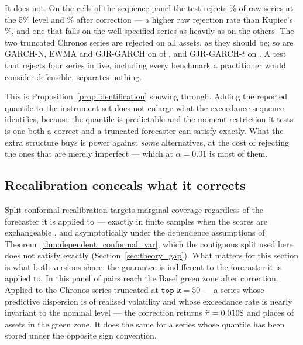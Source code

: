 \documentclass[preprint,11pt,authoryear]{elsarticle}
\newcommand{\1}{\boldsymbol{1}}
\begin{document}
It does not. On the \nSeqDQCells{} cells of the sequence panel the test rejects
\nSeqDQRejRaw\% of raw series at the 5\% level and \nSeqDQRejCor\% after
correction --- a higher raw rejection rate than Kupiec's
\nSeqKupiecRejRawOne\%, and one that falls on the well-specified series as
heavily as on the others. The two truncated Chronos series are rejected on all
\nMainAssets{} assets, as they should be; so are GARCH-N, EWMA and GJR-GARCH on
\nMainDQRejBenchmark{} of \nMainAssets{}, and GJR-GARCH-$t$ on
\nMainDQRejGjrT. A test that rejects four series in
five, including every benchmark a practitioner would consider defensible,
separates nothing.

This is Proposition~\ref{prop:identification} showing through. Adding the
reported quantile to the instrument set does not enlarge what the exceedance
sequence identifies, because the quantile is predictable and the moment
restriction it tests is one both a correct and a truncated forecaster can satisfy
exactly. What the extra structure buys is power against \emph{some} alternatives,
at the cost of rejecting the ones that are merely imperfect --- which at
$\alpha = 0.01$ is most of them.

\subsection{Recalibration conceals what it corrects}
\label{sec:blindspot_conformal}

Split-conformal recalibration targets marginal coverage regardless of the
forecaster it is applied to --- exactly in finite samples when the scores are
exchangeable \citep{vovk2005algorithmic,lei2018distribution}, and asymptotically
under the dependence assumptions of Theorem~\ref{thm:dependent_conformal_var},
which the contiguous split used here does not satisfy exactly
(Section~\ref{sec:theory_gap}). What matters for this section is what both
versions share: the guarantee is indifferent to the forecaster it is applied to.
In this panel \nMainGreen{} of \nMainPairs{} pairs reach the Basel green zone
after correction. Applied to the Chronos series truncated at
$\texttt{top\_k} = 50$ --- a series whose predictive dispersion is
\nDispDefaultSmall{} of realised volatility and whose exceedance rate is nearly
invariant to the nominal level --- the correction returns $\hat\pi =
0.0108$ and places \nTruncCorGreen{} of \nMainAssets{} assets in the green
zone. It does the same for a series whose quantile has been stored under the
opposite sign convention.
\end{document}
